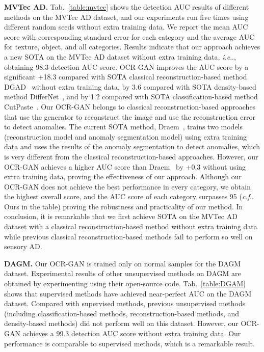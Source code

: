 \documentclass[lettersize,journal]{IEEEtran}
\makeatletter
\DeclareRobustCommand\onedot{\futurelet\@let@token\@onedot}
\def\@onedot{\ifx\@let@token.\else.\null\fi\xspace}
\def\ie{\emph{i.e}\onedot} \def\Ie{\emph{I.e}\onedot}
\def\cf{\emph{c.f}\onedot} \def\Cf{\emph{C.f}\onedot}
\makeatother
\begin{document}
\noindent\textbf{MVTec AD.} Tab.~\ref{table:mvtec} shows the detection AUC results of different methods on the MVTec AD dataset, and our experiments run five times using different random seeds without extra training data. We report the mean AUC score with corresponding standard error for each category and the average AUC for texture, object, and all categories. Results indicate that our approach achieves a new SOTA on the MVTec AD dataset without extra training data, \ie, obtaining 98.3 detection AUC score.
OCR-GAN improves the AUC score by a significant +18.3 compared with SOTA classical reconstruction-based method DGAD~\cite{xia2021discriminative} without extra training data, by 3.6 compared with SOTA density-based method DifferNet~\cite{rudolph2021same}, and by 1.2 compared with SOTA classification-based method CutPaste~\cite{li2021cutpaste}. Our OCR-GAN belongs to classical reconstruction-based approaches that use the generator to reconstruct the image and use the reconstruction error to detect anomalies. The current SOTA method, Draem~\cite{zavrtanik2021draem}, trains two models (reconstruction model and anomaly segmentation model) using extra training data and uses the results of the anomaly segmentation to detect anomalies, which is very different from the classical reconstruction-based approaches. However, our OCR-GAN achieves a higher AUC score than Draem~\cite{zavrtanik2021draem} by +0.3  without using extra training data, proving the effectiveness of our approach. Although our OCR-GAN does not achieve the best performance in every category, we obtain the highest overall score, and the AUC score of each category surpasses 95 (\cf Ours in the table) proving the robustness and practicality of our method. In conclusion, it is remarkable that we first achieve SOTA on the MVTec AD dataset with a classical reconstruction-based method without extra training data while previous classical reconstruction-based methods fail to perform so well on sensory AD.

\noindent\textbf{DAGM.} Our OCR-GAN is trained only on normal samples for the DAGM dataset.
Experimental results of other unsupervised methods on DAGM are obtained by experimenting using their open-source code. Tab.~\ref{table:DGAM} shows that supervised methods have achieved near-perfect AUC on the DAGM dataset. Compared with supervised methods, previous unsupervised methods (including classification-based methods, reconstruction-based methods, and density-based methods) did not perform well on this dataset. However, our OCR-GAN achieves a 99.3 detection AUC score without extra training data. Our performance is comparable to supervised methods, which is a remarkable result.
\end{document}
